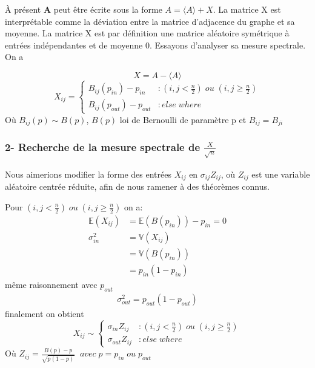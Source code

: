 À présent \textbf{A} peut être écrite sous la forme $A = \langle A \rangle + X$.
La matrice X est interprétable comme la déviation entre la matrice d'adjacence du graphe et sa moyenne.
La matrice X est par définition une matrice aléatoire symétrique à entrées indépendantes et de moyenne 0.
Essayons d'analyser sa mesure spectrale.
On a 

\begin{equation}
X = A - \langle A \rangle\nonumber
\end{equation}
\begin{equation}
	X_{ij}  = \left\{
	\begin{array}{lr}
		B_{ij}(p_{in}) - p_{in} & : (i,j < \frac{n}{2}) \; ou \; (i,j \ge \frac{n}{2}) \\
		B_{ij}(p_{out}) - p_{out} & : else \; where
	\end{array}
\right.\nonumber
\end{equation}
Où $B_{ij}(p) \sim B(p)$, $B(p)$ loi de Bernoulli de paramètre p et $B_{ij} = B_{ji}$\\


\subsubsection*{2- Recherche de la mesure spectrale de $\frac{X}{\sqrt{n}}$}
Nous aimerions modifier la forme des entrées $X_{ij}$ en $\sigma_{ij} Z_{ij}$, où $Z_{ij}$ est une variable aléatoire centrée réduite, afin de nous ramener à des théorèmes connus.

Pour $(i,j < \frac{n}{2}) \; ou \; (i,j \ge \frac{n}{2}) $ on a:
\begin{align*}
\mathbb{E}(X_{ij}) &= \mathbb{E}(B(p_{in}))- p_{in} = 0\\
\sigma_{in}^2 &= \mathbb{V}(X_{ij}) \\ 
			  &= \mathbb{V}(B(p_{in})) \\
			  &= p_{in} (1 - p_{in})
\end{align*}
même raisonnement avec $p_{out}$ 
\begin{align*}
\sigma_{out}^2 =  p_{out} (1 - p_{out})
\end{align*}
finalement on obtient 
\begin{equation}
	X_{ij} \sim \left\{
	\begin{array}{lr}
		\sigma_{in} Z_{ij} & : (i,j < \frac{n}{2}) \; ou \; (i,j \ge \frac{n}{2}) \\
		\sigma_{out} Z_{ij} & : else \; where
	\end{array}
\right.\nonumber
\end{equation}
Où $Z_{ij} = \frac{B(p) - p}{\sqrt{p(1-p)}} \;\;avec \; p = p_{in} \; ou \; p_{out}$\\

